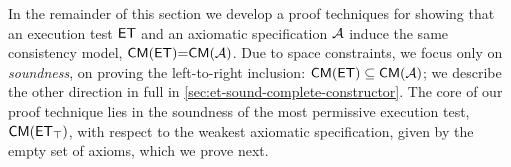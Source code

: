 In the remainder of this section we develop a proof techniques for showing  
that an execution test $\mathsf{ET}$ and an axiomatic specification $\mathcal{A}$ induce the same 
consistency model, \ie$\CMs(\ET) {=} \CMs(\Ax)$. 
Due to space constraints, we focus only on \emph{soundness}, \ie on proving the left-to-right inclusion: $\CMs(\ET) \subseteq \CMs(\Ax)$; 
we describe the other direction in full in \cref{sec:et-sound-complete-constructor}. 
The core of our proof technique lies in the soundness of the most permissive execution 
test, $\CMs(\ET_{\top})$, with respect to the weakest axiomatic specification, given by 
the empty set of axioms, which we prove next.
%

%

